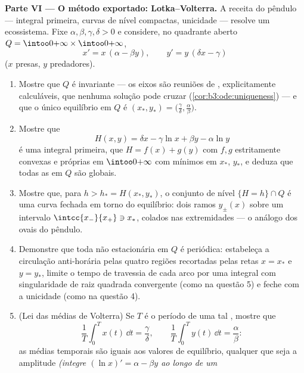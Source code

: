 \begin{problem}
\medskip
\noindent\textbf{Parte VI --- O método exportado: Lotka--Volterra.} A
receita do pêndulo --- integral primeira, curvas de nível compactas,
unicidade --- resolve um ecossistema. Fixe $\alpha, \beta, \gamma, \delta > 0$ e considere, no
quadrante aberto $Q = \intoo0{+\infty}\times\intoo0{+\infty}$,
\[
x' = x\,(\alpha - \beta y), \qquad
y' = y\,(\delta x - \gamma)
\]
($x$ presas, $y$ predadores).
\begin{enumerate}[resume]
  \item Mostre que $Q$ é invariante --- os eixos são reuniões de
        , explicitamente calculáveis, que nenhuma solução pode
        cruzar (\cref{cor:b3:ode:uniqueness}) --- e que o único equilíbrio em $Q$
        é $(x_*, y_*) =
        \bigl(\frac\gamma\delta, \frac\alpha\beta\bigr)$.
  \item Mostre que
        \[
        H(x, y) = \delta x - \gamma\ln x + \beta y -
        \alpha\ln y
        \]
        é uma integral primeira, que $H = f(x) + g(y)$ com $f, g$ estritamente
        convexas e próprias em $\intoo0{+\infty}$ com mínimos em $x_*$, $y_*$,
        e deduza que todas as  em $Q$ são globais.
  \item Mostre que, para $h > h_* = H(x_*, y_*)$, o conjunto de nível $\{H = h\}\cap Q$ é uma curva
        fechada em torno do equilíbrio: dois ramos  $y_\pm(x)$ sobre
        um intervalo  $\intcc{x_-}{x_+} \ni x_*$, colados nas extremidades --- o
        análogo dos ovais do pêndulo.
  \item Demonstre que toda  não estacionária em $Q$ é
        periódica: estabeleça a circulação anti-horária pelas quatro
        regiões recortadas pelas retas $x = x_*$ e $y = y_*$, limite o tempo de
        travessia de cada arco por uma integral com singularidade de
        raiz quadrada convergente (como na questão 5) e feche com a
        unicidade (como na questão 4).
  \item (Lei das médias de Volterra) Se $T$ é o período de uma tal
        , mostre que
        \[
        \frac1T\int_0^Tx(t)\,\dd t = \frac\gamma\delta,
        \qquad
        \frac1T\int_0^Ty(t)\,\dd t = \frac\alpha\beta :
        \]
        as médias temporais são iguais aos valores de equilíbrio,
        qualquer que seja a amplitude \emph{(integre $(\ln x)' =
        \alpha - \beta y$ ao longo de um
}
\end{enumerate}
\end{problem}
